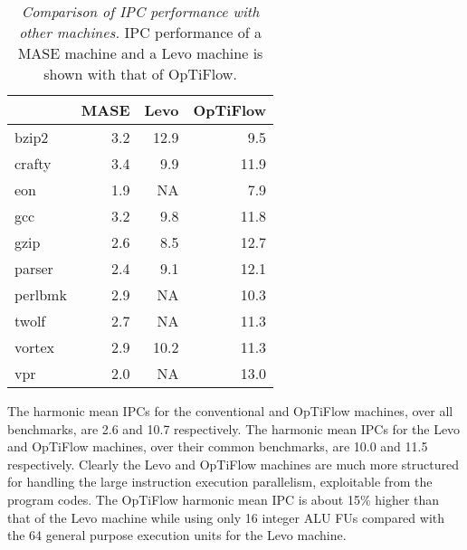 \documentclass[10pt,dvips]{article}
\begin{document}
\begin{table}[p]
\begin{center}
\caption{{\em Comparison of IPC performance with other machines.}
IPC performance of a MASE machine and a Levo machine is
shown with that of OpTiFlow.}
\label{tab:compare}
\vspace{+0.1in}
\begin{tabular}{|l||r|r|r|}
\hline 
 & MASE & Levo & OpTiFlow \\
\hline

\hline
bzip2&
3.2 & 12.9 & 9.5 \\

\hline
crafty&
3.4 & 9.9 & 11.9 \\

\hline
eon&
1.9 & NA & 7.9 \\

\hline
gcc&
3.2 & 9.8 & 11.8 \\

\hline
gzip&
2.6 & 8.5 & 12.7 \\

\hline
parser&
2.4 & 9.1 & 12.1 \\

\hline
perlbmk&
2.9 & NA & 10.3 \\

\hline
twolf&
2.7 & NA & 11.3 \\

\hline
vortex&
2.9 & 10.2 & 11.3 \\

\hline
vpr&
2.0 & NA & 13.0 \\

\hline
\end{tabular}
\end{center}
\end{table}
%
The harmonic mean IPCs for the conventional and OpTiFlow machines,
over all benchmarks, are 2.6 and 10.7 respectively.  
The harmonic mean IPCs for
the Levo and OpTiFlow machines, over their common benchmarks,
are 10.0 and 11.5 respectively.
Clearly the Levo and OpTiFlow machines are much more structured
for handling the large instruction execution parallelism,
exploitable from the program codes.
The OpTiFlow harmonic mean IPC is about 15\% higher than
that of the Levo machine while using only 16 integer ALU FUs
compared with the 64 general purpose execution units for the Levo machine.
%
%
\end{document}

